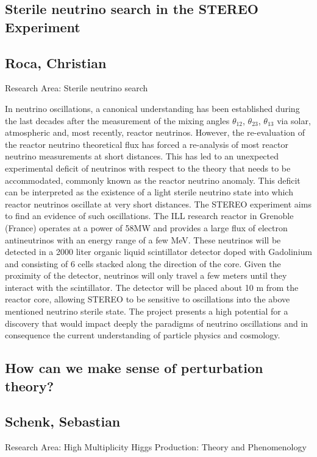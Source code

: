 \subsection*{\centering \large Sterile neutrino search in the STEREO Experiment}
\subsection*{\centering \normalsize Roca, Christian}
Research Area: \newline Sterile neutrino search

\noindent In neutrino oscillations, a canonical understanding has been established during the last decades after the measurement of the mixing angles $\theta_{12}$, $\theta_{23}$, $\theta_{13}$ via solar, atmospheric and, most recently, reactor neutrinos. However, the re-evaluation of the reactor neutrino theoretical flux has forced a re-analysis of most reactor neutrino measurements
at short distances. This has led to an unexpected experimental deficit of neutrinos with respect to the theory that needs to be accommodated, commonly known as the reactor neutrino anomaly. This deficit can be interpreted as the existence of a light sterile neutrino state into which reactor neutrinos oscillate at very short distances. The STEREO experiment aims to find an evidence of such oscillations.\newline
The ILL research reactor in Grenoble (France) operates at a power of 58MW and provides a large flux of electron antineutrinos with an energy range of a few MeV. These neutrinos will be detected in a 2000 liter organic liquid scintillator detector doped with Gadolinium and consisting of 6 cells stacked along the direction of the core. Given the proximity of the detector, neutrinos will only travel a few meters until they interact with the scintillator. The detector will be placed
about 10 m from the reactor core, allowing STEREO to be sensitive to oscillations into the above mentioned neutrino sterile state. The project presents a high potential for a discovery that would impact deeply the paradigms of neutrino oscillations and in consequence the current understanding of particle physics and cosmology.
\newpage
\subsection*{\centering \large How can we make sense of perturbation theory?}
\subsection*{\centering \normalsize Schenk, Sebastian}
Research Area:  High Multiplicity Higgs Production: Theory and Phenomenology\newline

